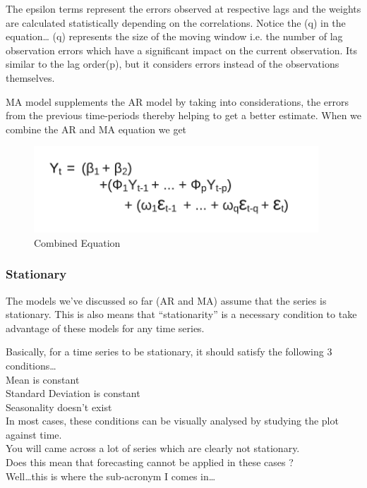 \documentclass[12pt]{report}
\begin{document}
The epsilon terms represent the errors observed at respective lags and the weights are calculated statistically depending on the correlations.
Notice the (q) in the equation…
(q) represents the size of the moving window i.e. the number of lag observation errors which have a significant impact on the current observation. Its similar to the lag order(p), but it considers errors instead of the observations themselves.

MA model supplements the AR model by taking into considerations, the errors from the previous time-periods thereby helping to get a better estimate.
When we combine the AR and MA equation we get

\begin{figure}[H]%
  \begin {center}
  \includegraphics[width=0.95\textwidth]{images/CombinedE.png}
  \caption{Combined Equation}
  \label{fig:ecg}
  \end {center}
\end{figure}

\subsubsection{Stationary}
The models we’ve discussed so far (AR and MA) assume that the series is stationary. This is also means that “stationarity” is a necessary condition to take advantage of these models for any time series.

Basically, for a time series to be stationary, it should satisfy the following 3 conditions…\\

Mean  is constant\\
Standard Deviation  is constant\\
Seasonality doesn’t exist\\


In most cases, these conditions can be visually analysed by studying the plot against time.\\

You will came across a lot of series which are clearly not stationary.\\
Does this mean that forecasting cannot be applied in these cases ?\\
Well…this is where the sub-acronym I comes in…
\end{document}
